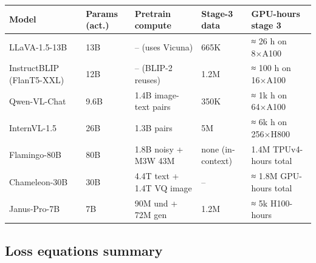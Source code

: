 {\def\LTcaptype{none} %
\begin{longtable}[]{@{}
  >{\raggedright\arraybackslash}p{}
  >{\raggedright\arraybackslash}p{}
  >{\raggedright\arraybackslash}p{}
  >{\raggedright\arraybackslash}p{}
  >{\raggedright\arraybackslash}p{}@{}}
\toprule\noalign{}
\begin{minipage}[b]{\linewidth}\raggedright
\textbf{Model}
\end{minipage} & \begin{minipage}[b]{\linewidth}\raggedright
\textbf{Params (act.)}
\end{minipage} & \begin{minipage}[b]{\linewidth}\raggedright
\textbf{Pretrain compute}
\end{minipage} & \begin{minipage}[b]{\linewidth}\raggedright
\textbf{Stage-3 data}
\end{minipage} & \begin{minipage}[b]{\linewidth}\raggedright
\textbf{GPU-hours stage 3}
\end{minipage} \\
\midrule\noalign{}
\endhead
\bottomrule\noalign{}
\endlastfoot
LLaVA-1.5-13B & 13B & -- (uses Vicuna) & 665K & ≈ 26 h on 8×A100 \\
InstructBLIP (FlanT5-XXL) & 12B & -- (BLIP-2 reuses) & 1.2M & ≈ 100 h on 16×A100 \\
Qwen-VL-Chat & 9.6B & 1.4B image-text pairs & 350K & ≈ 1k h on 64×A100 \\
InternVL-1.5 & 26B & 1.3B pairs & 5M & ≈ 6k h on 256×H800 \\
Flamingo-80B & 80B & 1.8B noisy + M3W 43M & none (in-context) & 1.4M TPUv4-hours total \\
Chameleon-30B & 30B & 4.4T text + 1.4T VQ image & -- & ≈ 1.8M GPU-hours total \\
Janus-Pro-7B & 7B & 90M und + 72M gen & 1.2M & ≈ 5k H100-hours \\
\end{longtable}
}

\subsection{Loss equations summary}\label{loss-equations-summary}

